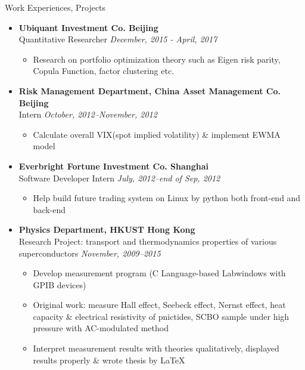 \documentclass[a4paper,8pt,oneside]{scrartcl}
\newenvironment{ressection}[1]{
    \vspace{2pt}
    {\selectfont#1}
    \begin{itemize}
    \vspace{0pt}
}{
    \end{itemize}
}
\newcommand{\resitems}[1]{
    \vspace{-4pt}
    \item #1
}
\newcommand{\ressubitem}[1]{
    \vspace{0pt}
    \item #1
}
\newcommand{\resbigitem}[3]{
    \vspace{-5pt}
    \item
    \textbf{#1}\\
    #2
    \textit{#3}
}
\newenvironment{ressubsec}[3]{
    \resbigitem{#1}{#2}{#3}
    \vspace{-2pt}
    \begin{itemize}
}{
    \end{itemize}
}
\begin{document}
\begin{ressection}{Work Experiences, Projects}
\begin{ressubsec}{Ubiquant Investment Co. \hfill Beijing}{Quantitative Researcher}{\hfill December, 2015 - April, 2017}
      \ressubitem{Research on portfolio optimization theory such as Eigen risk parity, Copula Function, factor clustering etc.}
  \end{ressubsec}
    \begin{ressubsec}{Risk Management Department, China Asset Management Co. \hfill Beijing}{Intern}{\hfill October,
        2012--November, 2012} 
        \ressubitem{Calculate overall VIX(spot implied volatility) \& implement EWMA model}
    \end{ressubsec}
    \begin{ressubsec}{Everbright Fortune Investment Co. \hfill Shanghai}{Software Developer Intern}{\hfill July,
        2012--end of Sep, 2012}
      \ressubitem{Help build future trading system on Linux by python both front-end and back-end}
    \end{ressubsec}
    \begin{ressubsec}{Physics Department, HKUST \hfill Hong Kong}{Research Project: transport and thermodynamics properties of various superconductors}
      {\hfill November, 2009--2015}
      \ressubitem{Develop measurement program (C Language-based Labwindows with GPIB devices)}
      \ressubitem{Original work: measure Hall effect, Seebeck effect, Nernst effect, heat capacity \& electrical resistivity of pnictides, SCBO sample under high pressure with AC-modulated method}
      \ressubitem{Interpret measurement results with theories qualitatively, displayed results properly \& wrote thesis by \LaTeX{}}
    \end{ressubsec}
\end{ressection}

\end{document}
